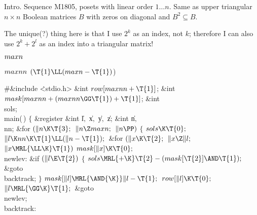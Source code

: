 
\srcloctrue
\datethis

Intro. Sequence M1805, posets with linear order $1\ldots
n$.
Same as upper triangular $n\times n$ Boolean matrices $B$
with zeros on diagonal and $B^2\subseteq B$.

The unique(?) thing here is that I use $2^k$ as an index, not $k$;
therefore I can also use $2^k+2^l$ as an index into a triangular matrix!

\Y\B\4\D$\\{maxn}$ \5
\par
\B\4\D$\\{maxnn}$ \5
$(\T{1}\LL(\\{maxn}-\T{1}){}$)\par
\Y\B\8\#\&{include} \.{<stdio.h>}\6
\&{int} ${}\\{row}[\\{maxnn}+\T{1}]{}$;\6
\&{int} ${}\\{mask}[\\{maxnn}+(\\{maxnn}\GG\T{1})+\T{1}]{}$;\6
\&{int} \\{sols};\7
\\{main}(\,)\1\1\2\2\6
${}\{{}$\1\6
\&{register} \&{int} \|l${},{}$ \|x${},{}$ \|y${},{}$ \|z;\6
\&{int} \|n${},{}$ \\{nn};\7
\&{for} ${}(\|n\K\T{3};{}$ ${}\|n\Z\\{maxn};{}$ ${}\|n\PP){}$\5
${}\{{}$\1\6
${}\\{sols}\K\T{0};{}$\6
${}\|l\K\\{nn}\K\T{1}\LL(\|n-\T{1});{}$\6
\&{for} ${}(\|x\K\T{2};{}$ ${}\|x\Z\|l;{}$ ${}\|x\MRL{{\LL}{\K}}\T{1}){}$\1\5
${}\\{mask}[\|x]\K\T{0};{}$\2\6
\4\\{newlev}:\5
\&{if} ${}(\|l\E\T{2}){}$\5
${}\{{}$\1\6
${}\\{sols}\MRL{+{\K}}\T{2}-(\\{mask}[\T{2}]\AND\T{1});{}$\6
\&{goto} \\{backtrack};\6
\4${}\}{}$\2\6
${}\\{mask}[\|l]\MRL{\AND{\K}}\|l-\T{1};{}$\6
${}\\{row}[\|l]\K\T{0};{}$\6
${}\|l\MRL{{\GG}{\K}}\T{1};{}$\6
\&{goto} \\{newlev};\6
\4\\{backtrack}:\5
